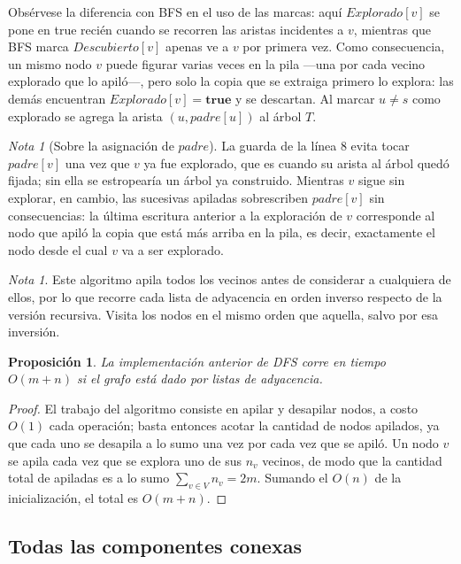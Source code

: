 \documentclass[12pt, spanish, oneside, openany]{book}
\theoremstyle{uprightplain}
\newtheorem{proposicion}[teorema]{Proposición}
\theoremstyle{definition}
\theoremstyle{remark}
\newtheorem{nota}[teorema]{Nota}
\theoremstyle{definition}
\begin{document}
Obsérvese la diferencia con BFS en el uso de las marcas: aquí $\mathit{Explorado}[v]$ se pone en true recién cuando se recorren las aristas incidentes a $v$, mientras que BFS marca $\mathit{Descubierto}[v]$ apenas ve a $v$ por primera vez. Como consecuencia, un mismo nodo $v$ puede figurar varias veces en la pila ---una por cada vecino explorado que lo apiló---, pero solo la copia que se extraiga primero lo explora: las demás encuentran $\mathit{Explorado}[v]=\textbf{true}$ y se descartan. Al marcar $u\neq s$ como explorado se agrega la arista $(u,\mathit{padre}[u])$ al árbol $T$.

\begin{nota}[Sobre la asignación de $\mathit{padre}$]
La guarda de la línea 8 evita tocar $\mathit{padre}[v]$ una vez que $v$ ya fue explorado, que es cuando su arista al árbol quedó fijada; sin ella se estropearía un árbol ya construido. Mientras $v$ sigue sin explorar, en cambio, las sucesivas apiladas sobrescriben $\mathit{padre}[v]$ sin consecuencias: la última escritura anterior a la exploración de $v$ corresponde al nodo que apiló la copia que está más arriba en la pila, es decir, exactamente el nodo desde el cual $v$ va a ser explorado.
\end{nota}

\begin{nota}
Este algoritmo apila todos los vecinos antes de considerar a cualquiera de ellos, por lo que recorre cada lista de adyacencia en orden inverso respecto de la versión recursiva. Visita los nodos en el mismo orden que aquella, salvo por esa inversión.
\end{nota}

\begin{proposicion}
\label{prop:dfs-tiempo}
La implementación anterior de DFS corre en tiempo $O(m+n)$ si el grafo está dado por listas de adyacencia.
\end{proposicion}
\begin{proof}
El trabajo del algoritmo consiste en apilar y desapilar nodos, a costo $O(1)$ cada operación; basta entonces acotar la cantidad de nodos apilados, ya que cada uno se desapila a lo sumo una vez por cada vez que se apiló. Un nodo $v$ se apila cada vez que se explora uno de sus $n_v$ vecinos, de modo que la cantidad total de apiladas es a lo sumo $\sum_{v\in V} n_v = 2m$. Sumando el $O(n)$ de la inicialización, el total es $O(m+n)$.
\end{proof}

\subsection{Todas las componentes conexas}
\label{sec:todas-componentes}
\end{document}
